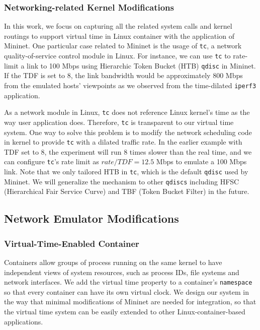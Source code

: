\subsubsection{Networking-related Kernel Modifications}
In this work, we focus on capturing all the related system calls and kernel routings to support virtual time in Linux container with the application of Mininet. One particular case related to Mininet is the usage of \texttt{tc}, a network quality-of-service control module in Linux\cite{TrafficControl}. For instance, we can use \texttt{tc} to rate-limit a link to 100 Mbps using Hierarchic Token Bucket (HTB) \texttt{qdisc} in Mininet. If the TDF is set to 8, the link bandwidth would be approximately 800 Mbps from the emulated hosts' viewpoints as we observed from the time-dilated \texttt{iperf3} application.

As a network module in Linux, \texttt{tc} does not reference Linux kernel's time as the way user application does. Therefore, \texttt{tc} is transparent to our virtual time system. One way to solve this problem is to modify the network scheduling code in kernel to provide \texttt{tc} with a dilated traffic rate. In the earlier example with TDF set to 8, the experiment will run 8 times slower than the real time, and we can configure \texttt{tc}'s rate limit as $rate/TDF=12.5$ Mbps to emulate a 100 Mbps link. 
Note that we only tailored HTB in \texttt{tc}, which is the default \texttt{qdisc} used by Mininet. We will generalize the mechanism to other \texttt{qdiscs} including HFSC (Hierarchical Fair Service Curve) and TBF (Token Bucket Filter) in the future.

\subsection{Network Emulator Modifications}
\label{Sub-Sec-ImplementMininet}

\subsubsection{Virtual-Time-Enabled Container}
Containers allow groups of process running on the same kernel to have independent views of system resources, such as process IDs, file systems and network interfaces. We add the virtual time property to a container's \texttt{namespace}\cite{LinuxNamespace} so that every container can have its own virtual clock. We design our system in the way that minimal modifications of Mininet are needed for integration, so that the virtual time system can be easily extended to other Linux-container-based applications. 

